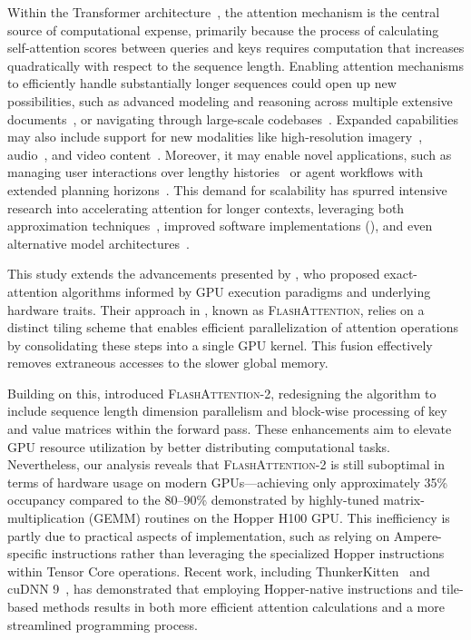 Within the Transformer architecture~\citep{vaswani2017attention}, the attention mechanism is the central source of computational expense, primarily because the process of calculating self-attention scores between queries and keys requires computation that increases quadratically with respect to the sequence length. Enabling attention mechanisms to efficiently handle substantially longer sequences could open up new possibilities, such as advanced modeling and reasoning across multiple extensive documents~\citep{guo2021longt5,shaham2022scrolls,peng2023yarn}, or navigating through large-scale codebases~\citep{roziere2023code, li2023starcoder}. Expanded capabilities may also include support for new modalities like high-resolution imagery~\citep{chen2022scaling}, audio~\citep{gulati2020conformer}, and video content~\citep{ho2022video}. Moreover, it may enable novel applications, such as managing user interactions over lengthy histories~\citep{sun2019bert4rec} or agent workflows with extended planning horizons~\citep{yao2022react}. This demand for scalability has spurred intensive research into accelerating attention for longer contexts, leveraging both approximation techniques~\citep{katharopoulos2020transformers,choromanski2020rethinking,
tay2020efficient}, improved software implementations (\citep{rabe2021self,dao2022flashattention,kwon2023efficient}), and even alternative model architectures~\citep{peng2023rwkv,sun2023retentive,gu2023mamba}.

This study extends the advancements presented by \citet{dao2022flashattention}, who proposed exact-attention algorithms informed by GPU execution paradigms and underlying hardware traits. Their approach in \citep{dao2022flashattention}, known as \textsc{FlashAttention}, relies on a distinct tiling scheme that enables efficient parallelization of attention operations by consolidating these steps into a single GPU kernel. This fusion effectively removes extraneous accesses to the slower global memory.

Building on this, \citet{dao2023flashattention2} introduced \textsc{FlashAttention-2}, redesigning the algorithm to include sequence length dimension parallelism and block-wise processing of key and value matrices within the forward pass. These enhancements aim to elevate GPU resource utilization by better distributing computational tasks. Nevertheless, our analysis reveals that \textsc{FlashAttention-2} is still suboptimal in terms of hardware usage on modern GPUs—achieving only approximately 35\% occupancy compared to the 80–90\% demonstrated by highly-tuned matrix-multiplication (GEMM) routines on the Hopper H100 GPU. This inefficiency is partly due to practical aspects of implementation, such as relying on Ampere-specific instructions rather than leveraging the specialized Hopper instructions within Tensor Core operations. Recent work, including ThunkerKitten~\citep{spector2024thunder} and cuDNN 9~\citep{cudnn9}, has demonstrated that employing Hopper-native instructions and tile-based methods results in both more efficient attention calculations and a more streamlined programming process.

